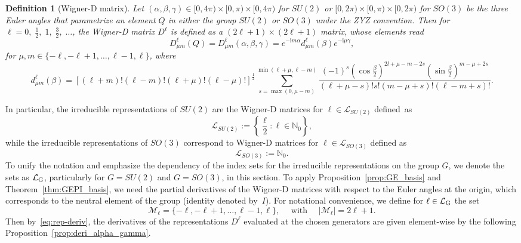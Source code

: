 \documentclass{article}
\newcommand{\card}[1]{|{#1}|}
\newtheorem{definition}[theorem]{Definition}
\numberwithin{equation}{section}
\def\N{\mathbb{N}}
\def\calM{\mathcal{M}}
\def\calL{\mathcal{L}}
\def\calLG{\mathcal{\calL_{\rm G}}}
\begin{document}
{\begin{definition}[Wigner-D matrix]\label{def:wigner-D}
Let $(\alpha, \beta, \gamma)\in
[0,4\pi)\times[0,\pi)\times[0,4\pi)$ for $SU(2)$
or 
$[0,2\pi)\times[0,\pi)\times[0,2\pi)$
for $SO(3)$
be the three Euler angles that parametrize an element $Q$ in either the group $SU(2)$ or $SO(3)$ under the ZYZ convention. Then for $\ell = 0,\; \frac12, \;1, \;\frac32, \;\ldots$, the Wigner-D matrix $D^\ell$ is defined as a $(2\ell+1)\times(2\ell+1)$ matrix, whose elements read
\begin{equation}
      D^\ell_{\mu m}(Q) = D^\ell_{\mu m}(\alpha, \beta, \gamma) = e^{-\mathrm{i}m\alpha}d^\ell_{\mu m}(\beta) e^{-\mathrm{i}\mu\gamma},
      \label{eq:wigner-D}
\end{equation}
for $\mu,m \in \{-\ell, -\ell+1, \ldots, \ell-1, \ell\}$, where
\[
    d^\ell_{\mu m}(\beta) = [(\ell+m)!(\ell-m)!(\ell+\mu)!(\ell-\mu)!]^\frac{1}{2}\sum_{s = \max(0, \mu-m)}^{\min(\ell+\mu,\ell-m)} \frac{(-1)^{s}(\cos \frac{\beta}{2})^{2l+\mu-m-2s}(\sin \frac{\beta}{2})^{m-\mu+2s}}{(\ell+\mu-s)!s!(m-\mu+s)!(\ell-m+s)!}.
\]
\end{definition}
In particular, the irreducible representations of $SU(2)$ are the Wigner-D matrices for 
$\ell \in \calL_{SU(2)}$ defined~as
\begin{equation}
    \label{eq:calL}
     \calL_{SU(2)} :=  \left\{\frac{\ell}{2}: \ell\in\N_0 \right\},
\end{equation}
while the irreducible representations of $SO(3)$ correspond to Wigner-D matrices for 
$\ell \in \calL_{SO(3)}$
defined as 
\begin{equation}
\label{eq:calL2}
     \calL_{SO(3)} := \N_0.
\end{equation}
To unify the notation and emphasize the dependency of the index sets for the irreducible representations on the group $G$, we denote the sets as $\calLG$, particularly for $G=SU(2)$ and $G=SO(3)$, in this section. To apply Proposition~\ref{prop:GE_basis} and Theorem~\ref{thm:GEPI_basis}, we need the partial derivatives of the Wigner-D matrices with respect to the Euler angles at the origin, which corresponds to the neutral element of the group (identity denoted by~$I$). For notational convenience, we define for $\ell\in\calLG$ the set
\begin{equation}
    \label{eq:calMU2}
        \calM_\ell = \{-\ell,-\ell+1,\ldots,\ell-1,\ell\}, 
        \quad \text{ with }
        \quad 
         \card{\calM_\ell} = 2\ell+1.
\end{equation}
Then by~\eqref{eq:rep-deriv}, the derivatives of the representations $D^\ell$ evaluated at the chosen generators are given element-wise by the following Proposition~\ref{prop:deri_alpha_gamma}. 

}
\end{document}
